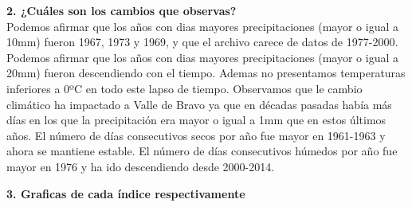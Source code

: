 \documentclass[12pt]{article}
\begin{document}
\noindent\textbf {2. ¿Cuáles son los cambios que observas?} \\
Podemos afirmar que los años con dias mayores precipitaciones (mayor o igual a 10mm) fueron 1967, 1973 y 1969, y que el archivo carece de datos de 1977-2000.
Podemos afirmar que los años con dias mayores precipitaciones (mayor o igual a 20mm) fueron descendiendo con el tiempo.
Ademas no presentamos temperaturas inferiores a 0ºC en todo este lapso de tiempo.
Observamos que le cambio climático ha impactado a Valle de Bravo ya que en décadas pasadas había más días en los que la precipitación era mayor o igual a 1mm que en estos últimos años.
El número de días consecutivos secos por año fue mayor en 1961-1963 y ahora se mantiene estable.
El número de días consecutivos húmedos por año fue mayor en 1976 y ha ido descendiendo desde 2000-2014.


\noindent\textbf {3. Graficas de cada índice respectivamente } \\
\end{document}
